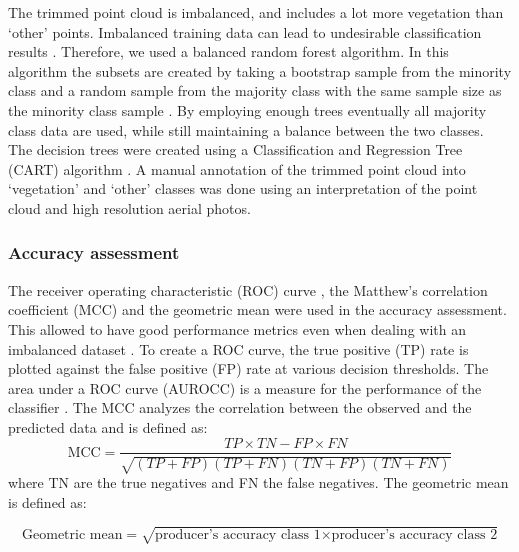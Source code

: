 The trimmed point cloud is imbalanced, and includes a lot more vegetation than `other' points. Imbalanced training data can lead to undesirable classification results \citep{he2009learning}. Therefore, we used a balanced random forest algorithm. In this algorithm the subsets are created by taking a bootstrap sample from the minority class and a random sample from the majority class with the same sample size as the minority class sample \citep{chen2004using}. By employing enough trees eventually all majority class data are used, while still maintaining a balance between the two classes. The decision trees were created using a Classification and Regression Tree (CART) algorithm \citep{breiman1984classification}. A manual annotation of the trimmed point cloud into `vegetation' and `other' classes was done using an interpretation of the point cloud and high resolution aerial photos.


\subsubsection{Accuracy assessment}
The receiver operating characteristic (ROC) curve \citep{bradley1997use}, the Matthew’s correlation coefficient (MCC) \citep{matthews1975comparison} and the geometric mean \citep{kubat1998machine} were used in the accuracy assessment. This allowed to have good performance metrics even when dealing with an imbalanced dataset \citep{kohavi1995study, sun2009classification, lopez2013insight}. To create a ROC curve, the true positive (TP) rate is plotted against the false positive (FP) rate at various decision thresholds. The area under a ROC curve (AUROCC) is a measure for the performance of the classifier \citep{bradley1997use}. The MCC analyzes the correlation between the observed and the predicted data and is defined as:
\begin{equation}
	\label{eq:MCC}
	{\text{MCC}}={\frac{TP\times TN-FP\times FN}{{\sqrt{(TP+FP)(TP+FN)(TN+FP)(TN+FN)}}}}
\end{equation}
where TN are the true negatives and FN the false negatives. The geometric mean is defined as:

\begin{equation}
	\label{eq:geom}
	{\text{Geometric mean}}={\sqrt{\text{producer's accuracy class 1} \times \text{producer's accuracy class 2}}}
\end{equation}

